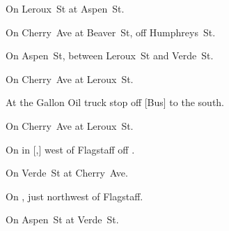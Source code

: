 
\begin{LocationList}

On Leroux~St at Aspen~St.

On Cherry~Ave at Beaver~St, off  Humphreys~St.

On Aspen~St, between Leroux~St and Verde~St.

On Cherry~Ave at Leroux~St.

At the Gallon Oil truck stop off [Bus] to the south.

\Location{\GarageHQ \Garage}
On Cherry~Ave at Leroux~St.

On  in [,] west of Flagstaff off  .

On Verde~St at Cherry~Ave.

On , just northwest of Flagstaff.

On Aspen~St at Verde~St.

\end{LocationList}
